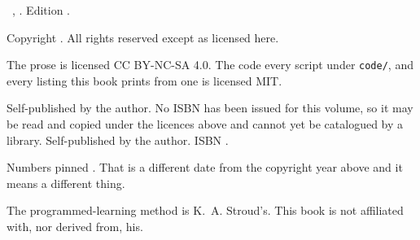 
\thispagestyle{empty}
\vspace*{\fill}

{\small\color{mgrey}\raggedright\setlength{\parindent}{0pt}%
\emph{\mfaseriestitle} \dash{} \lblVolume~\mfavolnumeral,
\emph{\mfavoltitlehere}. Edition \bookedition.

\medskip
Copyright \textcopyright{} \bookyear{} \mfabookauthor. All rights reserved
except as licensed here.

\medskip
The prose is licensed CC BY-NC-SA 4.0. The code \dash{} every script under
\texttt{code/}, and every listing this book prints from one \dash{} is
licensed MIT.

\medskip
\ifx\mfavolisbn\relax
Self-published by the author. No ISBN has been issued for this volume, so it
may be read and copied under the licences above and cannot yet be catalogued
by a library.
\else
Self-published by the author. ISBN \mfavolisbn.
\fi

\medskip
\lblAiAssist

\medskip
Numbers pinned \pinnedon. That is a different date from the copyright year
above and it means a different thing.

\medskip
The programmed-learning method is K.~A. Stroud's. This book is not affiliated
with, nor derived from, his.
\par}

\cleardoublepage
